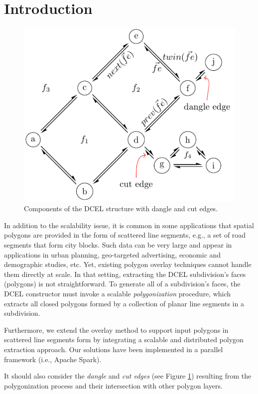 \section{Introduction} %

\begin{figure}
    \centering
    \includegraphics[width=0.6\linewidth]{chapterExtension/dcel_example2}
    \caption{Components of the DCEL structure with dangle and cut edges.}\label{fig:extension_dcel_example}
\end{figure}

In addition to the scalability issue, it is common in some applications that spatial polygons are provided in the form of scattered line segments, e.g., a set of road segments that form city blocks.  Such data can be very large and appear in applications in urban planning, geo-targeted advertising, economic and demographic studies, etc.  Yet, existing polygon overlay techniques cannot handle them directly at scale.  In that setting, extracting the DCEL subdivision's faces (polygons) is not straightforward.  To generate all of a subdivision's faces, the DCEL constructor must invoke a scalable \textit{polygonization} procedure, which extracts all closed polygons formed by a collection of planar line segments in a subdivision.

Furthermore, we extend the overlay method to support input polygons in scattered line segments form by integrating a scalable and distributed polygon extraction approach.  Our solutions have been implemented in a parallel framework (i.e., Apache Spark).

It should also consider the \textit{dangle} and \textit{cut edges} (see Figure  \ref{fig:extension_dcel_example}) resulting from the polygonization process and their intersection with other polygon layers.

